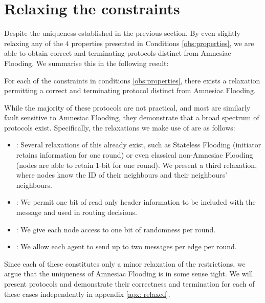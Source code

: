 \section{ Relaxing the constraints}
\label{sec: relaxation}
\label{Relaxing}
Despite the uniqueness established in the previous section.
By even slightly relaxing any of the $4$ properties presented in Conditions \ref{obs:properties}, we are able to obtain correct and terminating protocols distinct from Amnesiac Flooding.
We summarise this in the following result:
\begin{theorem}
    \label{thm: Relaxation}
    For each of the constraints in conditions \ref{obs:properties}, there exists a relaxation permitting a correct and terminating protocol distinct from Amnesiac Flooding. 
\end{theorem}
While the majority of these protocols are not practical, and most are similarly fault sensitive to Amnesiac Flooding, they demonstrate that a broad spectrum of protocols exist.
Specifically, the relaxations we make use of are as follows:
\begin{itemize}
    \item \StrongTrueStatelessness: Several relaxations of this already exist, such as Stateless Flooding (initiator retains information for one round) or even classical non-Amnesiac Flooding (nodes are able to retain 1-bit for one round). We present a third relaxation, where nodes know the ID of their neighbours and their neighbours' neighbours.\label{relax: stateless}
    \item \Obliviousness: We permit one bit of read only header information to be included with the message and used in routing decisions. \label{relax: blind}
    \item \Determinism: We give each node access to one bit of randomness per round. \label{relax: determinism}
    \item \Bandwidth: We allow each agent to send up to two messages per edge per round. \label{relax: bandwidth}
\end{itemize}
Since each of these constitutes only a minor relaxation of the restrictions, we argue that the uniqueness of Amnesiac Flooding is in some sense tight.
We will present protocols and demonstrate their correctness and termination for each of these cases independently in appendix \ref{apx: relaxed}.


